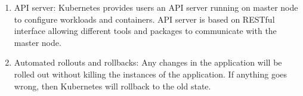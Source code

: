 \begin{enumerate}
\item API server:
Kubernetes provides users an API server running on master node to configure workloads and containers. API server is based on RESTful interface allowing different tools and packages to communicate with the master node.

\item Automated rollouts and rollbacks:
Any changes in the application will be rolled out without killing the instances of the application. If anything goes wrong, then Kubernetes will rollback to the old state.

\end{enumerate}